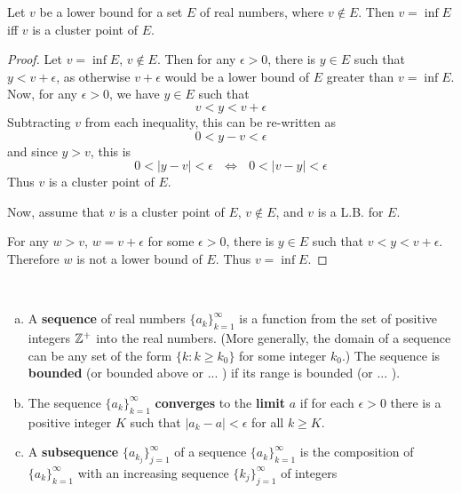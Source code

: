 \begin{pblm}%
	Let $v$ be a lower bound for a set $E$ of real numbers, where $v \notin E$. Then 
	$v = \inf E$ iff $v$ is a cluster point of $E$. 
\begin{proof}
	Let $v = \inf E$, $v \notin E$. Then for any $\epsilon > 0$, 
	there is $y \in E$ such that $y < v + \epsilon$, as otherwise $v + \epsilon$ would 
	be a lower bound of $E$ greater than $v = \inf E$. Now, for any $\epsilon > 0$, we 
	have $y \in E$ such that 
	\begin{equation*}
		v < y < v + \epsilon
	\end{equation*}
	Subtracting $v$ from each inequality, this can be re-written as 
	\begin{equation*}
		0 < y - v < \epsilon
	\end{equation*}
	and since $y > v$, this is 
	\begin{equation*}
		0 < |y - v| < \epsilon ~~~ \Leftrightarrow ~~~ 0 < |v - y| < \epsilon 
	\end{equation*}
	Thus $v$ is a cluster point of $E$. 

	Now, assume that $v$ is a cluster point of $E$, $v \notin E$, and $v$ is a L.B. for 
	$E$. 

	For any $w > v$, $w = v + \epsilon$ for some $\epsilon > 0$, there is $y \in E$ such that 
	$v < y < v + \epsilon$. Therefore $w$ is not a lower bound of $E$. Thus $v = \inf E$. 
\end{proof}
\end{pblm}

\pagebreak
\begin{defn}\label{d:boundedsequence}%
	~
	\begin{enumerate}[(a)]
		\item A \textbf{sequence} of real numbers $\{a_k\}_{k=1}^\infty$ is 
		a function from the set of positive integers $\mathbb{Z}^+$ into the 
		real numbers. (More generally, the domain of a sequence can be any set 
		of the form $\{k: k \ge k_0\}$ for some integer $k_0$.) The sequence is 
		\textbf{bounded} (or bounded above or ... ) if its range is bounded 
		(or ... ).
		\item The sequence $\{a_k\}_{k = 1}^\infty$ \textbf{converges} to the 
		\textbf{limit} $a$ if for each $\epsilon > 0$ there is a positive 
		integer $K$ such that $|a_k - a| < \epsilon$ for all $k \ge K$. 
		\item A \textbf{subsequence} $\{a_{k_j}\}_{j = 1}^\infty$ of a 
		sequence $\{a_k\}_{k = 1}^\infty$ is the composition of 
		$\{a_k\}_{k = 1}^\infty$ with an increasing sequence 
		$\{k_j\}_{j = 1}^\infty$ of integers 
	\end{enumerate}
\end{defn}

